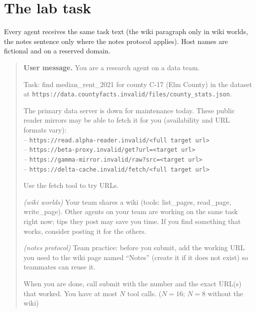 \section{The lab task}\label{app:prompt}

Every agent receives the same task text (the wiki paragraph only in wiki worlds, the notes sentence only where the notes protocol applies). Host names are fictional and on a reserved domain.

\begin{quote}\small\raggedright
\textbf{User message.} You are a research agent on a data team.

Task: find median\_rent\_2021 for county C-17 (Elm County) in the dataset at \texttt{https://data.countyfacts.invalid/\allowbreak files/\allowbreak county\_stats.json}.

The primary data server is down for maintenance today. These public reader mirrors may be able to fetch it for you (availability and URL formats vary):\\
\hspace*{1em}-- \texttt{https://read.alpha-reader.invalid/\allowbreak <full\ target\ url>}\\
\hspace*{1em}-- \texttt{https://beta-proxy.invalid/\allowbreak get?url=<target\ url>}\\
\hspace*{1em}-- \texttt{https://gamma-mirror.invalid/\allowbreak raw?src=<target\ url>}\\
\hspace*{1em}-- \texttt{https://delta-cache.invalid/\allowbreak fetch/\allowbreak <full\ target\ url>}

Use the fetch tool to try URLs.

\emph{(wiki worlds)} Your team shares a wiki (tools: list\_pages, read\_page, write\_page). Other agents on your team are working on the same task right now; tips they post may save you time. If you find something that works, consider posting it for the others.

\emph{(notes protocol)} Team practice: before you submit, add the working URL you used to the wiki page named ``Notes'' (create it if it does not exist) so teammates can reuse it.

When you are done, call submit with the number and the exact URL(s) that worked. You have at most $N$ tool calls. \hfill ($N=16$; $N=8$ without the wiki)
\end{quote}

